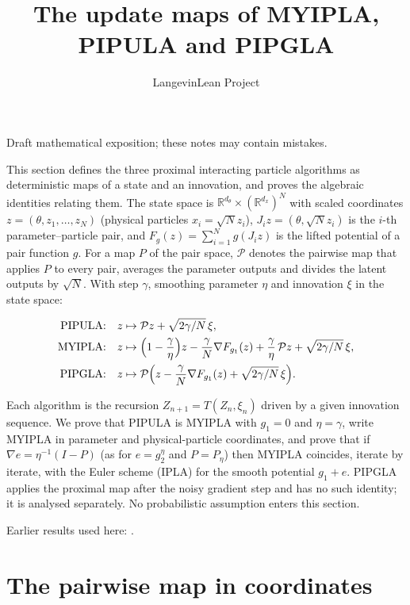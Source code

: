 \documentclass[11pt,a4paper]{article}
\title{\texorpdfstring{The update maps of MYIPLA, PIPULA and PIPGLA}{The update maps of MYIPLA, PIPULA and PIPGLA}}
\author{LangevinLean Project}
\date{}
\begin{document}
\maketitle
Draft mathematical exposition; these notes may contain mistakes.


This section defines the three proximal interacting particle algorithms as deterministic maps of a state and an innovation, and proves the algebraic identities relating them. The state space is \(\mathbb R^{d_\theta}\times(\mathbb R^{d_x})^N\) with scaled coordinates \(z=(\theta,z_1,\dots,z_N)\) (physical particles \(x_i=\sqrt Nz_i\)), \(J_iz=(\theta,\sqrt Nz_i)\) is the \(i\)-th parameter–particle pair, and \(F_g(z)=\sum_{i=1}^Ng(J_iz)\) is the lifted potential of a pair function \(g\). For a map \(P\) of the pair space, \(\mathcal P\) denotes the pairwise map that applies \(P\) to every pair, averages the parameter outputs and divides the latent outputs by \(\sqrt N\). With step \(\gamma\), smoothing parameter \(\eta\) and innovation \(\xi\) in the state space:


\[\begin{aligned}
\text{PIPULA:}\quad&z\mapsto\mathcal Pz+\sqrt{2\gamma/N}\,\xi,\\
\text{MYIPLA:}\quad&z\mapsto\Bigl(1-\frac\gamma\eta\Bigr)z-\frac\gamma N\nabla F_{g_1}(z)+\frac\gamma\eta\,\mathcal Pz+\sqrt{2\gamma/N}\,\xi,\\
\text{PIPGLA:}\quad&z\mapsto\mathcal P\Bigl(z-\frac\gamma N\nabla F_{g_1}(z)+\sqrt{2\gamma/N}\,\xi\Bigr).
\end{aligned}\]


Each algorithm is the recursion \(Z_{n+1}=T(Z_n,\xi_n)\) driven by a given innovation sequence. We prove that PIPULA is MYIPLA with \(g_1=0\) and \(\eta=\gamma\), write MYIPLA in parameter and physical-particle coordinates, and prove that if \(\nabla e=\eta^{-1}(I-P)\) (as for \(e=g_2^\eta\) and \(P=P_\eta\)) then MYIPLA coincides, iterate by iterate, with the Euler scheme (IPLA) for the smooth potential \(g_1+e\). PIPGLA applies the proximal map after the noisy gradient step and has no such identity; it is analysed separately. No probabilistic assumption enters this section.



Earlier results used here: \cite[Section~3.4]{LangevinLean2026IPLA}.

\section{\texorpdfstring{The pairwise map in coordinates}{The pairwise map in coordinates}}
\end{document}
